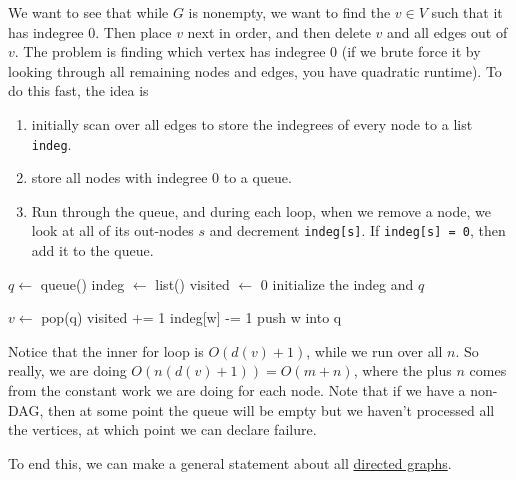   \begin{algo}
    We want to see that while $G$ is nonempty, we want to find the $v \in V$ such that it has indegree $0$. Then place $v$ next in order, and then delete $v$ and all edges out of $v$. The problem is finding which vertex has indegree $0$ (if we brute force it by looking through all remaining nodes and edges, you have quadratic runtime). To do this fast, the idea is 
    \begin{enumerate}
      \item initially scan over all edges to store the indegrees of every node to a list \texttt{indeg}. 
      \item store all nodes with indegree $0$ to a queue. 
      \item Run through the queue, and during each loop, when we remove a node, we look at all of its out-nodes $s$ and decrement \texttt{indeg[s]}. If \texttt{indeg[s] = 0}, then add it to the queue. 
    \end{enumerate}
    \begin{algorithm}[H]
      \label{alg:recursive_top_sort}
      \begin{algorithmic}[1]
        \State $q \gets$ queue() 
        \State indeg $\gets$ list() 
        \State visited $\gets$ 0
          \State initialize the indeg and $q$ 

            \State $v \gets$ pop(q) 
            \State visited += 1 
              \State indeg[w] -= 1 
                \State push w into q 
              \EndIf
            \EndFor
          \EndWhile

            \State {}
          \EndIf

          \State {}
        \EndFunction
      \end{algorithmic}
    \end{algorithm}
    Notice that the inner for loop is $O(d(v) + 1)$, while we run over all $n$. So really, we are doing $O(n(d(v) + 1)) = O(m + n)$, where the plus $n$ comes from the constant work we are doing for each node. Note that if we have a non-DAG, then at some point the queue will be empty but we haven't processed all the vertices, at which point we can declare failure. 
  \end{algo}

  To end this, we can make a general statement about all \hyperref[def:directed-graph]{directed graphs}. 

